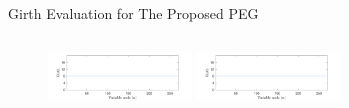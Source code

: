 \documentclass[11pt, aspectratio=169]{beamer}
\begin{document}
\begin{frame}{Girth Evaluation for The Proposed PEG}
\begin{columns}
\begin{column}{0.55\textwidth}
\begin{center}
{\begin{figure}[tb]
\begin{minipage}{.5\linewidth}
					\end{minipage}
					\hspace{-0.2 cm}
					\begin{minipage}{.5\linewidth}
						\hspace{-0.5 cm}
						\includegraphics[width=1.5in]{gambarafa/girth/girthpeg7-9.pdf}
					\end{minipage}
					\hfill
					\hspace{-0.22 cm}
					\begin{minipage}{.5\linewidth}
										\hspace{-0.75 cm}
						\includegraphics[width=1.5in]{gambarafa/girth/girthpeg37-45.pdf}
					\end{minipage}
					\label{gambar: girthds}
				\end{figure}
				}
			\end{center}
		\end{column}
	\end{columns}
	
	
	
	
	

\end{frame}
\end{document}
